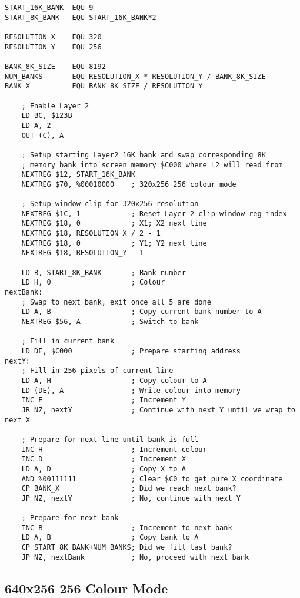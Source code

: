 \documentclass[12pt,twoside,openright,a4paper]{book}
\begin{document}
\begin{Verbatim}
START_16K_BANK  EQU 9
START_8K_BANK   EQU START_16K_BANK*2

RESOLUTION_X    EQU 320
RESOLUTION_Y    EQU 256

BANK_8K_SIZE    EQU 8192
NUM_BANKS       EQU RESOLUTION_X * RESOLUTION_Y / BANK_8K_SIZE
BANK_X          EQU BANK_8K_SIZE / RESOLUTION_Y

	; Enable Layer 2
	LD BC, $123B
	LD A, 2
	OUT (C), A

	; Setup starting Layer2 16K bank and swap corresponding 8K
	; memory bank into screen memory $C000 where L2 will read from
	NEXTREG $12, START_16K_BANK
	NEXTREG $70, %00010000    ; 320x256 256 colour mode

	; Setup window clip for 320x256 resolution
	NEXTREG $1C, 1            ; Reset Layer 2 clip window reg index
	NEXTREG $18, 0            ; X1; X2 next line
	NEXTREG $18, RESOLUTION_X / 2 - 1
	NEXTREG $18, 0            ; Y1; Y2 next line
	NEXTREG $18, RESOLUTION_Y - 1

	LD B, START_8K_BANK       ; Bank number
	LD H, 0                   ; Colour
nextBank:
	; Swap to next bank, exit once all 5 are done
	LD A, B                   ; Copy current bank number to A
	NEXTREG $56, A            ; Switch to bank

	; Fill in current bank
	LD DE, $C000              ; Prepare starting address
nextY:
	; Fill in 256 pixels of current line
	LD A, H                   ; Copy colour to A
	LD (DE), A                ; Write colour into memory
	INC E                     ; Increment Y
	JR NZ, nextY              ; Continue with next Y until we wrap to next X

	; Prepare for next line until bank is full
	INC H                     ; Increment colour
	INC D                     ; Increment X
	LD A, D                   ; Copy X to A
	AND %00111111             ; Clear $C0 to get pure X coordinate
	CP BANK_X                 ; Did we reach next bank?
	JP NZ, nextY              ; No, continue with next Y

	; Prepare for next bank
	INC B                     ; Increment to next bank
	LD A, B                   ; Copy bank to A
	CP START_8K_BANK+NUM_BANKS; Did we fill last bank?
	JP NZ, nextBank           ; No, proceed with next bank
\end{Verbatim}


\subsection{640x256 256 Colour Mode}
\end{document}
